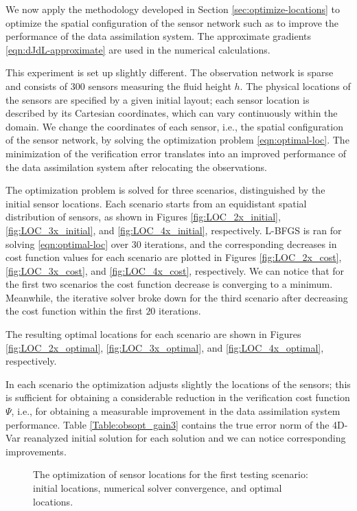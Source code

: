 \documentclass{article}
\begin{document}
We now apply the methodology developed in Section \ref{sec:optimize-locations} to optimize the spatial configuration
of the sensor network such as to improve the performance of the data assimilation system. The approximate
gradients \eqref{eqn:dJdL-approximate} are used in the numerical calculations.

This experiment is set up slightly different. 
The observation network is sparse and consists of $300$ sensors measuring the fluid height $h$.
The physical locations of the sensors are specified by a given initial layout; each sensor location is described by
its Cartesian coordinates, which can vary continuously within the domain.
We change the coordinates of each sensor, i.e., the spatial configuration of the sensor network,
by solving the optimization problem \eqref{eqn:optimal-loc}. The minimization of the verification error
translates into an improved performance of the data assimilation system after relocating the observations.

The optimization problem is solved for three scenarios, distinguished by the initial sensor locations.
Each scenario starts from an equidistant spatial distribution of sensors, as shown in 
Figures \ref{fig:LOC_2x_initial}, \ref{fig:LOC_3x_initial}, and \ref{fig:LOC_4x_initial}, respectively.
L-BFGS is ran for solving \eqref{eqn:optimal-loc} over $30$ iterations, and the corresponding 
decreases in cost function values for each scenario are plotted in 
Figures \ref{fig:LOC_2x_cost}, \ref{fig:LOC_3x_cost}, and \ref{fig:LOC_4x_cost}, respectively.
We can notice that for the first two scenarios the cost function decrease is converging to a minimum.
Meanwhile, the iterative solver broke down for the third scenario after decreasing the cost function within the first $20$ iterations.

The resulting optimal locations for each scenario are shown in 
Figures \ref{fig:LOC_2x_optimal}, \ref{fig:LOC_3x_optimal}, and \ref{fig:LOC_4x_optimal}, respectively. 

In each scenario the optimization adjusts slightly the locations of the sensors; this is sufficient
for obtaining a considerable reduction in the verification cost function $\Psi$, i.e.,
for obtaining a measurable improvement in the data assimilation system performance.
Table \ref{Table:obsopt_gain3} contains the true error norm of the 4D-Var reanalyzed initial solution
for each solution and we can notice corresponding improvements.



\begin{figure}
\setcounter{subfigure}{0}
\centering
\caption{The optimization of sensor locations for the first testing scenario: initial locations, numerical solver convergence, and optimal locations.}
\end{figure}
\end{document}
